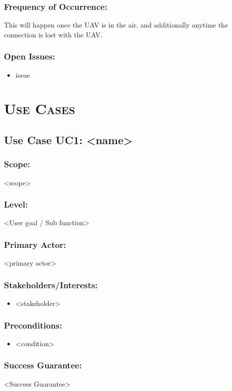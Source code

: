 \documentclass[ProductRequirements.tex]{subfiles}
\begin{document}
		\subsubsection*{Frequency of Occurrence:}
			This will happen once the UAV is in the air, and additionally anytime the connection is lost with the UAV.
		\subsubsection*{Open Issues:}
			\begin{itemize}\itemsep1pt
				\item issue
			\end{itemize}		
		
	
	\section{\textsc{\Large Use Cases}}
	\subsection{Use Case UC1: <name>}
	\subsubsection*{Scope:}
	<scope>
	\subsubsection*{Level:}
	<User goal / Sub function>
	\subsubsection*{Primary Actor:}
	<primary actor>
	\subsubsection*{Stakeholders/Interests:}
	\begin{itemize}\itemsep1pt
		\item <stakeholder>
	\end{itemize}
	\subsubsection*{Preconditions:}
	\begin{itemize}\itemsep1pt
		\item <condition>
	\end{itemize}
	\subsubsection*{Success Guarantee:}
	<Success Guarantee>
\end{document}
